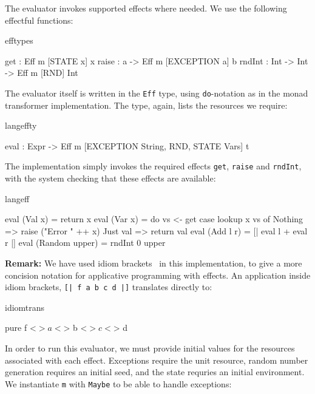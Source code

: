 \noindent
The evaluator invokes supported effects where needed. We use the following
effectful functions:

\begin{SaveVerbatim}{efftypes}

get    : Eff m [STATE x] x
raise  : a -> Eff m [EXCEPTION a] b
rndInt : Int -> Int -> Eff m [RND] Int

\end{SaveVerbatim}

\noindent
The evaluator itself is written in the \texttt{Eff} type, using
\texttt{do}-notation as in the monad transformer implementation. The 
type, again, lists the resources we require:

\begin{SaveVerbatim}{langeffty}

eval : Expr -> 
       Eff m [EXCEPTION String, RND, STATE Vars] t

\end{SaveVerbatim}

\noindent
The implementation simply invokes the required effects \texttt{get},
\texttt{raise} and \texttt{rndInt}, with the \Eff{} system checking that
these effects are available:

\begin{SaveVerbatim}{langeff}

eval (Val x) = return x
eval (Var x) = 
    do vs <- get
       case lookup x vs of
            Nothing => raise ("Error " ++ x)
            Just val => return val
eval (Add l r) = [| eval l + eval r |]
eval (Random upper) = rndInt 0 upper

\end{SaveVerbatim}

\noindent
\textbf{Remark:}
We have used idiom brackets~\cite{McBride2007} in this implementation, to
give a more concision notation for applicative programming with effects.
An application inside idiom brackets, \texttt{[| f a b c d |]} translates
directly to:

\begin{SaveVerbatim}{idiomtrans}

pure f <$> a <$> b <$> c <$> d

\end{SaveVerbatim}

\noindent
In order to run this evaluator, we must provide initial values for the resources
associated with each effect. Exceptions require the unit resource, random
number generation requires an initial seed, and the state requries an initial
environment. We instantiate \texttt{m} with \texttt{Maybe} to be able
to handle exceptions:

